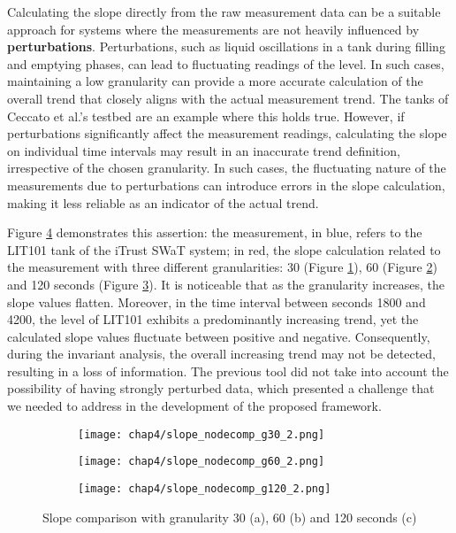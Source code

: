 \bigskip
Calculating the slope directly from the raw measurement data can be a suitable approach for systems where the measurements are not heavily influenced by \textbf{perturbations}. Perturbations, such as liquid oscillations in a tank during filling and emptying phases, can lead to fluctuating readings of the level. In such cases, maintaining a low granularity can provide a more accurate calculation of the overall trend that closely aligns with the actual measurement trend. The tanks of Ceccato et al.'s testbed are an example where this holds true.\newline
However, if perturbations significantly affect the measurement readings, calculating the slope on individual time intervals may result in an inaccurate trend definition, irrespective of the chosen granularity. In such cases, the fluctuating nature of the measurements due to perturbations can introduce errors in the slope calculation, making it less reliable as an indicator of the actual trend.

\bigskip
Figure \ref{fig:4_slope_comparison} demonstrates this assertion: the measurement, in blue, refers to the LIT101 tank of the iTrust SWaT system; in red, the slope calculation related to the measurement with three different granularities: 30 (Figure \ref{subfig:4_slope_g30_nodecomp}), 60 (Figure \ref{subfig:4_slope_g60_nodecomp}) and 120 seconds (Figure \ref{subfig:4_slope_g120_nodecomp}). It is noticeable that as the granularity increases, the slope values flatten. Moreover, in the time interval between seconds 1800 and 4200, the level of LIT101 exhibits a predominantly increasing trend, yet the calculated slope values fluctuate between positive and negative. Consequently, during the invariant analysis, the overall increasing trend may not be detected, resulting in a loss of information.\newline \newline
The previous tool did not take into account the possibility of having strongly perturbed data, which presented a challenge that we needed to address in the development of the proposed framework.
\vfill
\pagebreak

\begin{figure}[H]
	\centering
	\begin{subfigure}{0.9\textwidth}
		\texttt{[image: chap4/slope\_nodecomp\_g30\_2.png]}
		\caption{}
		\label{subfig:4_slope_g30_nodecomp}
	\end{subfigure}
	\hfill
	\begin{subfigure}{0.9\textwidth}
		\texttt{[image: chap4/slope\_nodecomp\_g60\_2.png]}
		\caption{}
		\label{subfig:4_slope_g60_nodecomp}
	\end{subfigure}
	\begin{subfigure}{0.9\textwidth}
		\texttt{[image: chap4/slope\_nodecomp\_g120\_2.png]}
		\caption{}
		\label{subfig:4_slope_g120_nodecomp}
	\end{subfigure}
	\caption{Slope comparison with granularity 30 (a), 60 (b) and 120 seconds (c)}
	\label{fig:4_slope_comparison}
\end{figure}

